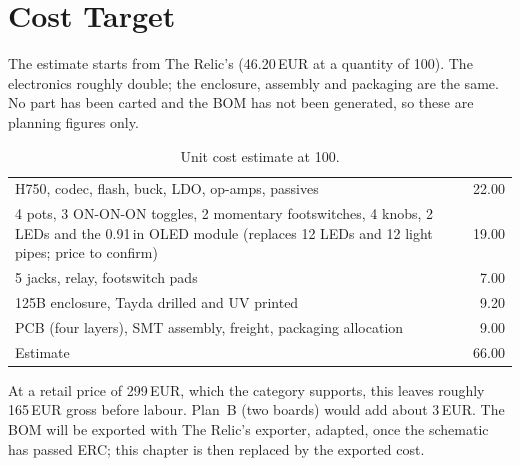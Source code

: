 \chapter{Cost Target}\label{ch:cost}

The estimate starts from The Relic's (46.20\,EUR at a quantity of 100). The electronics roughly double; the enclosure, assembly and packaging are the same. No part has been carted and the BOM has not been generated, so these are planning figures only.

\begin{table}[H]
  \small\renewcommand{\arraystretch}{1.12}
  \caption{Unit cost estimate at 100.}\label{tab:cost}
  \begin{tabularx}{\textwidth}{@{}L r@{}}
    \toprule
     &  \\
    \midrule
    H750, codec, flash, buck, LDO, op-amps, passives & 22.00 \\
    4 pots, 3 ON-ON-ON toggles, 2 momentary footswitches, 4 knobs, 2 LEDs and the 0.91\,in OLED module (replaces 12 LEDs and 12 light pipes; price to confirm) & 19.00 \\
    5 jacks, relay, footswitch pads & 7.00 \\
    125B enclosure, Tayda drilled and UV printed & 9.20 \\
    PCB (four layers), SMT assembly, freight, packaging allocation & 9.00 \\
    \midrule
    Estimate & 66.00 \\
    \bottomrule
  \end{tabularx}
\end{table}

At a retail price of 299\,EUR, which the category supports, this leaves roughly 165\,EUR gross before labour. Plan~B (two boards) would add about 3\,EUR. The BOM will be exported with The Relic's exporter, adapted, once the schematic has passed ERC; this chapter is then replaced by the exported cost.
